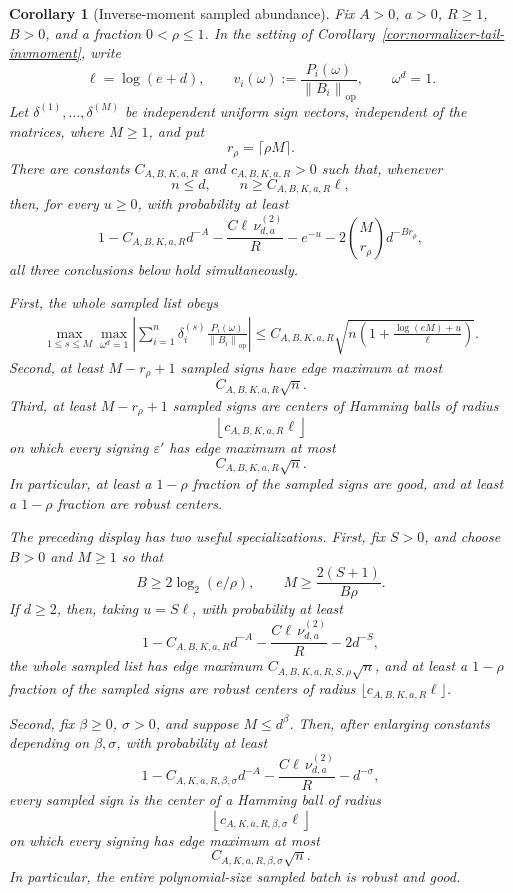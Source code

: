 \documentclass[11pt]{amsart}
\numberwithin{equation}{section}
\newtheorem{corollary}[theorem]{Corollary}
\theoremstyle{definition}
\theoremstyle{remark}
\newcommand{\op}{\mathrm{op}}
\newcommand{\norm}[1]{\left\lVert #1\right\rVert}
\newcommand{\eps}{\varepsilon}
\begin{document}
\begin{corollary}[Inverse-moment sampled abundance]
\label{cor:normalizer-tail-invmoment-abundance}
Fix \(A>0\), \(a>0\), \(R\ge1\), \(B>0\), and a fraction \(0<\rho\le1\).
In the setting of Corollary~\ref{cor:normalizer-tail-invmoment}, write
\[
  \ell=\log(e+d),\qquad
  v_i(\omega):=\frac{P_i(\omega)}{\norm{B_i}_{\op}},
  \qquad \omega^d=1.
\]
Let \(\delta^{(1)},\ldots,\delta^{(M)}\) be independent uniform sign vectors,
independent of the matrices, where \(M\ge1\), and put
\[
  r_\rho=\lceil\rho M\rceil .
\]
There are constants \(C_{A,B,K,a,R}\) and \(c_{A,B,K,a,R}>0\) such that,
whenever
\[
  n\le d,\qquad n\ge C_{A,B,K,a,R}\ell ,
\]
then, for every \(u\ge0\), with probability at least
\[
  1-C_{A,B,K,a,R}d^{-A}
  -\frac{C\ell\,\nu_{d,a}^{(2)}}{R}
  -e^{-u}-2\binom{M}{r_\rho}d^{-B r_\rho},
\]
all three conclusions below hold simultaneously.

First, the whole sampled list obeys
\[
\begin{aligned}
  \max_{1\le s\le M}\max_{\omega^d=1}
  \left|\sum_{i=1}^n\delta_i^{(s)}
  \frac{P_i(\omega)}{\norm{B_i}_{\op}}\right|
  \le
  C_{A,B,K,a,R}\sqrt{
    n\left(1+\frac{\log(eM)+u}{\ell}\right)} .
\end{aligned}
\]
Second, at least \(M-r_\rho+1\) sampled signs have edge maximum at most
\[
  C_{A,B,K,a,R}\sqrt n .
\]
Third, at least \(M-r_\rho+1\) sampled signs are centers of Hamming balls of
radius
\[
  \left\lfloor c_{A,B,K,a,R}\ell\right\rfloor
\]
on which every signing \(\eps'\) has edge maximum at most
\[
  C_{A,B,K,a,R}\sqrt n .
\]
In particular, at least a \(1-\rho\) fraction of the sampled signs are good,
and at least a \(1-\rho\) fraction are robust centers.

The preceding display has two useful specializations.  First, fix \(S>0\), and
choose \(B>0\) and \(M\ge1\) so that
\[
  B\ge 2\log_2(e/\rho),
  \qquad
  M\ge \frac{2(S+1)}{B\rho}.
\]
If \(d\ge2\), then, taking \(u=S\ell\), with probability at least
\[
  1-C_{A,B,K,a,R}d^{-A}
  -\frac{C\ell\,\nu_{d,a}^{(2)}}{R}
  -2d^{-S},
\]
the whole sampled list has edge maximum \(C_{A,B,K,a,R,S,\rho}\sqrt n\), and
at least a \(1-\rho\) fraction of the sampled signs are robust centers of
radius \(\lfloor c_{A,B,K,a,R}\ell\rfloor\).

Second, fix \(\beta\ge0\), \(\sigma>0\), and suppose \(M\le d^\beta\).
Then, after enlarging constants depending on \(\beta,\sigma\), with
probability at least
\[
  1-C_{A,K,a,R,\beta,\sigma}d^{-A}
  -\frac{C\ell\,\nu_{d,a}^{(2)}}{R}
  -d^{-\sigma},
\]
every sampled sign is the center of a Hamming ball of radius
\[
  \left\lfloor c_{A,K,a,R,\beta,\sigma}\ell\right\rfloor
\]
on which every signing has edge maximum at most
\[
  C_{A,K,a,R,\beta,\sigma}\sqrt n .
\]
In particular, the entire polynomial-size sampled batch is robust and good.


\end{corollary}
\end{document}
